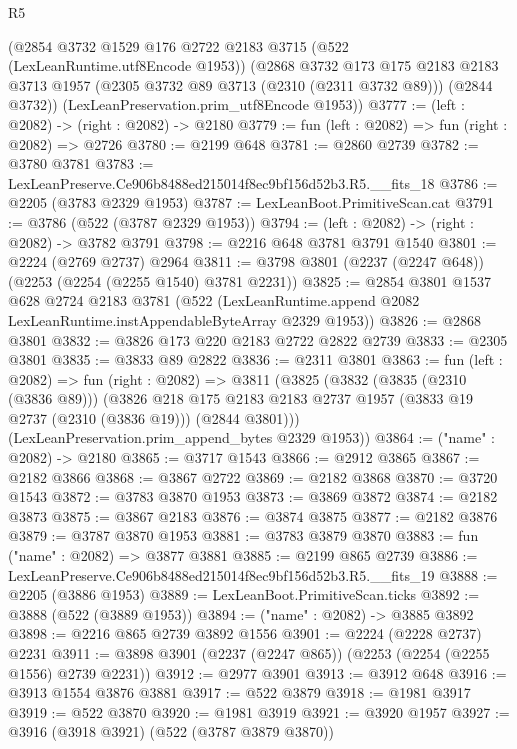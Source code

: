 \begin{lexlean}{R5}
\begin{coremodule}
    (@2854
      @3732
      @1529
      @176
      @2722
      @2183
      @3715
      (@522 (LexLeanRuntime.utf8Encode @1953))
      (@2868
        @3732
        @173
        @175
        @2183
        @2183
        @3713
        @1957
        (@2305 @3732 @89 @3713 (@2310 (@2311 @3732 @89)))
        (@2844 @3732))
      (LexLeanPreservation.prim_utf8Encode @1953))
@3777 := (left : @2082) -> (right : @2082) -> @2180
@3779 := fun (left : @2082) => fun (right : @2082) => @2726
@3780 := @2199 @648
@3781 := @2860 @2739
@3782 := @3780 @3781
@3783 := LexLeanPreserve.Ce906b8488ed215014f8ec9bf156d52b3.R5.__fits_18
@3786 := @2205 (@3783 @2329 @1953)
@3787 := LexLeanBoot.PrimitiveScan.cat
@3791 := @3786 (@522 (@3787 @2329 @1953))
@3794 := (left : @2082) -> (right : @2082) -> @3782 @3791
@3798 := @2216 @648 @3781 @3791 @1540
@3801 := @2224 (@2769 @2737) @2964
@3811 := @3798 @3801 (@2237 (@2247 @648)) (@2253 (@2254 (@2255 @1540) @3781 @2231))
@3825 := @2854
    @3801
    @1537
    @628
    @2724
    @2183
    @3781
    (@522 (LexLeanRuntime.append @2082 LexLeanRuntime.instAppendableByteArray @2329 @1953))
@3826 := @2868 @3801
@3832 := @3826 @173 @220 @2183 @2722 @2822 @2739
@3833 := @2305 @3801
@3835 := @3833 @89 @2822
@3836 := @2311 @3801
@3863 := fun (left : @2082) =>
  fun (right : @2082) =>
  @3811
    (@3825
      (@3832
        (@3835 (@2310 (@3836 @89)))
        (@3826
          @218
          @175
          @2183
          @2183
          @2737
          @1957
          (@3833 @19 @2737 (@2310 (@3836 @19)))
          (@2844 @3801)))
      (LexLeanPreservation.prim_append_bytes @2329 @1953))
@3864 := ("name" : @2082) -> @2180
@3865 := @3717 @1543
@3866 := @2912 @3865
@3867 := @2182 @3866
@3868 := @3867 @2722
@3869 := @2182 @3868
@3870 := @3720 @1543
@3872 := @3783 @3870 @1953
@3873 := @3869 @3872
@3874 := @2182 @3873
@3875 := @3867 @2183
@3876 := @3874 @3875
@3877 := @2182 @3876
@3879 := @3787 @3870 @1953
@3881 := @3783 @3879 @3870
@3883 := fun ("name" : @2082) => @3877 @3881
@3885 := @2199 @865 @2739
@3886 := LexLeanPreserve.Ce906b8488ed215014f8ec9bf156d52b3.R5.__fits_19
@3888 := @2205 (@3886 @1953)
@3889 := LexLeanBoot.PrimitiveScan.ticks
@3892 := @3888 (@522 (@3889 @1953))
@3894 := ("name" : @2082) -> @3885 @3892
@3898 := @2216 @865 @2739 @3892 @1556
@3901 := @2224 (@2228 @2737) @2231
@3911 := @3898 @3901 (@2237 (@2247 @865)) (@2253 (@2254 (@2255 @1556) @2739 @2231))
@3912 := @2977 @3901
@3913 := @3912 @648
@3916 := @3913 @1554 @3876 @3881
@3917 := @522 @3879
@3918 := @1981 @3917
@3919 := @522 @3870
@3920 := @1981 @3919
@3921 := @3920 @1957
@3927 := @3916 (@3918 @3921) (@522 (@3787 @3879 @3870))

\end{coremodule}
\end{lexlean}
